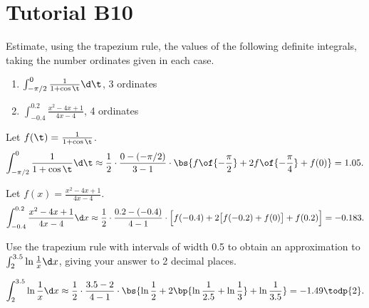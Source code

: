 \section{Tutorial B10}

\begin{problem}
    Estimate, using the trapezium rule, the values of the following definite integrals, taking the number ordinates given in each case.

    \begin{enumerate}
        \item $\int_{-\pi/2}^0 \frac1{1 + \cos\t} \d \t$, 3 ordinates
        \item $\int_{-0.4}^{0.2} \frac{x^2 - 4x + 1}{4x - 4}$, 4 ordinates
    \end{enumerate}
\end{problem}
\begin{solution}
    \begin{ppart}
        Let $f(\t) = \frac1{1+\cos\t}$. \[\int_{-\pi/2}^0 \frac1{1 + \cos\t} \d \t \approx \frac12 \cdot \frac{0 - (-\pi/2)}{3-1} \cdot \bs{f\of{-\frac\pi2} + 2f\of{-\frac\pi4} + f(0)} = 1.05.\]
    \end{ppart}
    \begin{ppart}
        Let $f(x) = \frac{x^2 - 4x + 1}{4x - 4}$. \[\int_{-0.4}^{0.2} \frac{x^2 - 4x + 1}{4x - 4} \d x \approx \frac12 \cdot \frac{0.2 - (-0.4)}{4 - 1} \cdot \Big[f(-0.4) + 2\big[f(-0.2) + f(0)\big] + f(0.2)\Big] = -0.183.\]
    \end{ppart}
\end{solution}

\begin{problem}
    Use the trapezium rule with intervals of width 0.5 to obtain an approximation to $\int_2^{3.5} \ln \frac1x \d x$, giving your answer to 2 decimal places.
\end{problem}
\begin{solution}
    \begin{align*}
        \int_2^{3.5} \ln \frac1x \d x \approx \frac12 \cdot \frac{3.5 - 2}{4 - 1} \cdot \bs{\ln \frac12 + 2\bp{\ln \frac1{2.5} + \ln \frac13} + \ln \frac1{3.5}} = -1.49 \todp{2}.
    \end{align*}
\end{solution}

